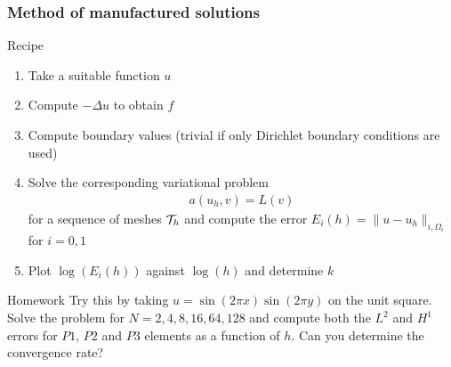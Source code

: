 \begin{frame}[shrink=10]
    \frametitle{Method of manufactured solutions}
    \begin{block}{Recipe}
        \begin{enumerate}
            \item Take a suitable function $u$
            \item Compute $-\Delta u$ to obtain $f$
            \item Compute boundary values (trivial if only Dirichlet
                boundary conditions are used)
            \item Solve the corresponding variational problem
                \begin{align*}
                    a(u_h,v) = L(v)
                \end{align*}
                for a sequence of meshes $\mathcal{T}_h$ and compute the
                error $E_i(h) = \|u - u_h \|_{i,\Omega_i}$ for $i = 0,1$
            \item Plot $\log(E_i(h))$ against $\log(h)$ and determine
                $k$
        \end{enumerate}
    \end{block}
    \begin{block}{Homework}
        Try this by taking $ u = \sin(2\pi
        x)\sin(2\pi y)$ on the unit square.
        Solve the problem for $N = 2,4,8,16,64,128$ and compute both the
        $L^2$ and $H^1$ errors for $P1$, $P2$ and $P3$ elements as a
        function of $h$. Can you determine the convergence rate?
    \end{block}
\end{frame}
